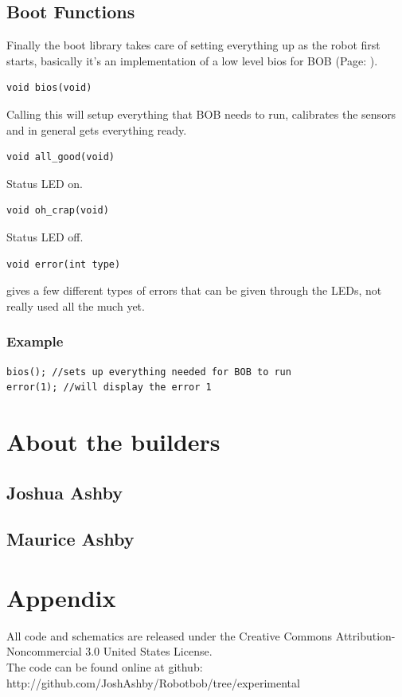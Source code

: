 \documentclass{article}
\begin{document}
\subsection{Boot Functions}
Finally the boot library takes care of setting everything up as the robot first starts, basically it's an implementation of a low level bios for BOB (Page: \pageref{boot}).\\
\begin{verbatim}void bios(void)\end{verbatim}
Calling this will setup everything that BOB needs to run, calibrates the sensors and in general gets everything ready.
\begin{verbatim}void all_good(void)\end{verbatim}
Status LED on.
\begin{verbatim}void oh_crap(void)\end{verbatim}
Status LED off.
\begin{verbatim}void error(int type)\end{verbatim}
gives a few different types of errors that can be given through the LEDs, not really used all the much yet.
\subsubsection{Example}
\begin{lstlisting}[caption={Boot examples},label=bootex,frame=tbl]
bios(); //sets up everything needed for BOB to run
error(1); //will display the error 1
\end{lstlisting}

\newpage
\section{About the builders}
\subsection{Joshua Ashby}
\subsection{Maurice Ashby}

\newpage
\section{Appendix}
All code and schematics are released under the Creative Commons Attribution-Noncommercial 3.0 United States License.\\
The code can be found online at github: http://github.com/JoshAshby/Robotbob/tree/experimental\\
\end{document}
